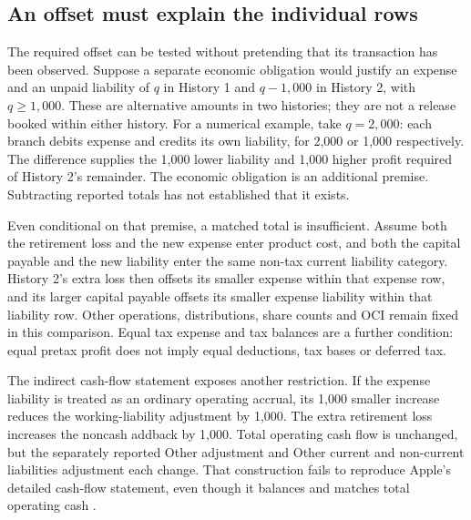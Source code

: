 \subsection{An offset must explain the individual rows}
\label{sec:apple-coupled-completion}

The required offset can be tested without pretending that its transaction has
been observed. Suppose a separate economic obligation would justify an
expense and an unpaid liability of $q$ in History 1 and $q-1{,}000$ in
History 2, with $q\geq1{,}000$. These are alternative amounts in two histories;
they are not a release booked within either history. For a numerical example,
take $q=2{,}000$: each branch debits expense and credits its own liability,
for 2,000 or 1,000 respectively. The difference supplies the 1,000 lower
liability and 1,000 higher profit required of History 2's remainder.
The economic obligation is an additional premise. Subtracting reported
totals has not established that it exists.

Even conditional on that premise, a matched total is insufficient. Assume
both the retirement loss and the new expense enter product cost, and both
the capital payable and the new liability enter the same non-tax current
liability category. History 2's extra loss then offsets its smaller expense
within that expense row, and its larger capital payable offsets its smaller
expense liability within that liability row. Other operations, distributions,
share counts and OCI remain fixed in this comparison. Equal tax expense and
tax balances are a further condition: equal pretax profit does not imply
equal deductions, tax bases or deferred tax.

The indirect cash-flow statement exposes another restriction. If the
expense liability is treated as an ordinary operating accrual, its 1,000
smaller increase reduces the working-liability adjustment by 1,000. The
extra retirement loss increases the noncash addback by 1,000. Total operating
cash flow is unchanged, but the separately reported Other adjustment and
Other current and non-current liabilities adjustment each change. That
construction fails to reproduce Apple's detailed cash-flow statement,
even though it balances and matches total operating cash
\citep[printed p.~33]{apple2024}.

